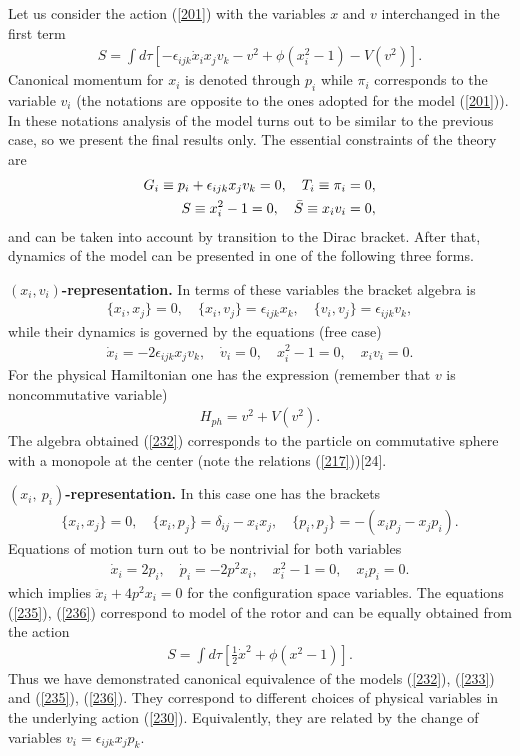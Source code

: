 \documentclass[paper a4]{article}
\begin{document}
Let us consider the action (\ref{201}) with the variables $x$ and $v$
interchanged in the first term
\begin{eqnarray}\label{230}
S=\int d\tau\left[-\epsilon_{ijk}\dot x_ix_jv_k-
v^2+\phi(x_i^2-1)-V(v^2)\right].
\end{eqnarray}
Canonical momentum for $x_i$ is denoted through $p_i$ while
$\pi_i$ corresponds to the variable $v_i$ (the notations are opposite
to the ones adopted for the model (\ref{201})).
In these notations analysis of the model turns out to be similar
to the previous case, so we present the final results only. The essential
constraints of the theory are
\begin{eqnarray}\label{231}
G_i\equiv p_i+\epsilon_{ijk}x_jv_k=0, \quad
T_i\equiv\pi_i=0, \cr
S\equiv x_i^2-1=0, \quad \bar S\equiv x_iv_i=0,
\end{eqnarray}
and can be taken into account by transition to the Dirac bracket.
After that, dynamics of the model can be presented in one of the
following three forms.

{\bf $(x_i, v_i)$-representation.} In terms of these variables the
bracket algebra is
\begin{eqnarray}\label{232}
\{x_i, x_j\}=0, \quad
\{x_i, v_j\}=\epsilon_{ijk}x_k, \quad
\{v_i, v_j\}=\epsilon_{ijk}v_k,
\end{eqnarray}
while their dynamics is governed by the equations (free case)
\begin{eqnarray}\label{233}
\dot x_i=-2\epsilon_{ijk}x_jv_k, \quad
\dot v_i=0, \quad
x_i^2-1=0, \quad x_iv_i=0.
\end{eqnarray}
For the physical Hamiltonian one has the expression (remember that $v$
is noncommutative variable)
\begin{eqnarray}\label{234}
H_{ph}=v^2+V(v^2).
\end{eqnarray}
The algebra obtained (\ref{232}) corresponds to the particle on
commutative sphere with a monopole at the center (note the relations
(\ref{217}))[24].

{\bf $(x_i, ~ p_i)$-representation.}
In this case one has the brackets
\begin{eqnarray}\label{235}
\{x_i, x_j\}=0, \quad
\{x_i, p_j\}=\delta_{ij}-x_ix_j, \quad
\{p_i, p_j\}= -(x_ip_j-x_jp_i).
\end{eqnarray}
Equations of motion turn out to be nontrivial for both variables
\begin{eqnarray}\label{236}
\dot x_i=2p_i, \quad \dot p_i=-2p^2x_i, \quad
x_i^2-1=0, \quad x_ip_i=0.
\end{eqnarray}
which implies $\ddot x_i+4p^2x_i=0$ for the configuration space variables.
The equations (\ref{235}), (\ref{236}) correspond to model of the
rotor and can be equally obtained from the action
\begin{eqnarray}\label{238}
S=\int d\tau\left[\frac{1}{2}\dot x^2 +\phi(x^2-1)\right].
\end{eqnarray}
Thus we have demonstrated canonical equivalence of the models
(\ref{232}), (\ref{233}) and (\ref{235}), (\ref{236}).
They correspond to different choices of physical variables in the
underlying action (\ref{230}). Equivalently, they are related by the
change of variables $v_i=\epsilon_{ijk}x_jp_k$.
\end{document}
